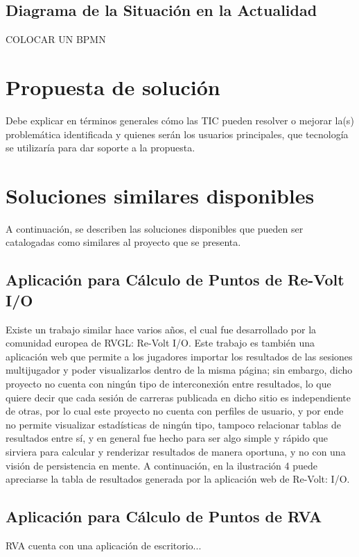 \subsection{Diagrama de la Situación en la Actualidad}
COLOCAR UN BPMN

\section{Propuesta de solución}
Debe explicar en términos generales cómo las TIC pueden resolver o mejorar la(s) problemática identificada y quienes serán los usuarios principales, que tecnología se utilizaría para dar soporte a la propuesta.

\section{Soluciones similares disponibles}
A continuación, se describen las soluciones disponibles que pueden ser catalogadas como similares al proyecto que se presenta.

\subsection{Aplicación para Cálculo de Puntos de Re-Volt I/O}
Existe un trabajo similar hace varios años, el cual fue desarrollado por la comunidad europea de RVGL: Re-Volt I/O. Este trabajo es también una aplicación web que permite a los jugadores importar los resultados de las sesiones multijugador y poder visualizarlos dentro de la misma página; sin embargo, dicho proyecto no cuenta con ningún tipo de interconexión entre resultados, lo que quiere decir que cada sesión de carreras publicada en dicho sitio es independiente de otras, por lo cual este proyecto no cuenta con perfiles de usuario, y por ende no permite visualizar estadísticas de ningún tipo, tampoco relacionar tablas de resultados entre sí, y en general fue hecho para ser algo simple y rápido que sirviera para calcular y renderizar resultados de manera oportuna, y no con una visión de persistencia en mente. A continuación, en la ilustración 4 puede apreciarse la tabla de resultados generada por la aplicación web de Re-Volt: I/O.

\subsection{Aplicación para Cálculo de Puntos de RVA}
RVA cuenta con una aplicación de escritorio...

